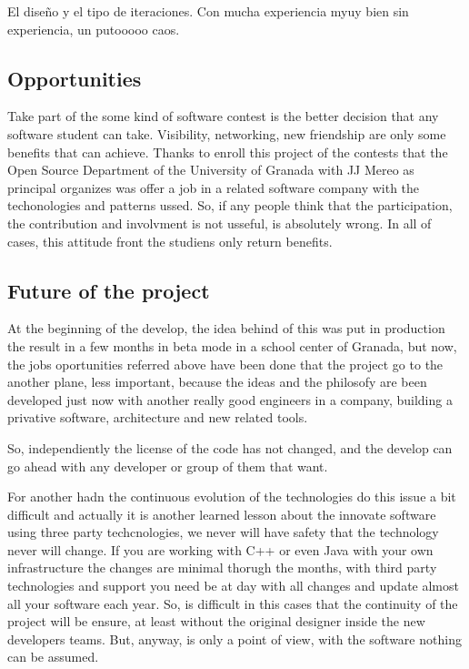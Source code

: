 El diseño y el tipo de iteraciones. Con mucha experiencia myuy bien
sin experiencia, un putooooo caos.



\subsection{Opportunities}

Take part of the some kind of software contest is the better decision that any
software student can take. Visibility, networking, new friendship are only some
benefits that can achieve.
Thanks to enroll this project of the contests that the Open Source Department of
 the University of Granada with JJ Mereo as principal organizes was offer a job
 in a related software company with the techonologies and patterns ussed.
So, if any people think that the participation, the contribution and involvment
is not usseful, is absolutely wrong. In all of cases, this attitude front the
studiens only return benefits.

\subsection{Future of the project}

At the beginning of the develop, the idea behind of this was put in production
the result in a few months in beta mode in a school center of Granada, but now,
the jobs oportunities referred above have been done that the project go to the
another plane, less important, because the ideas and the philosofy are been
developed just now with another really good engineers in a company, building a
privative software, architecture and new related tools.

So, independiently the license of the code has not changed, and the develop can
 go ahead with any developer or group of them that want.

For another hadn the continuous evolution of the technologies do this issue a
bit difficult and actually it is another learned lesson about the innovate
software using three party techcnologies, we never will have safety that the
technology never will change. If you are working with C++ or even Java with your
own infrastructure the changes are minimal thorugh the months, with third party
technologies and support you need be at day with all changes and update almost
all your software each year. So, is difficult in this cases that the continuity
of the project will be ensure, at least without the original designer inside the
new developers teams. But, anyway, is only a point of view, with the software
nothing can be assumed.

